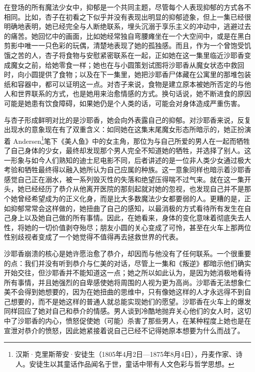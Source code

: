 在登场的所有魔法少女中，抑郁是一个共同主题，尽管每个人表现抑郁的方式各不相同。比如，杏子在初看之下似乎并没有表现出明显的抑郁迹象，但上一集已经很明确地表明，她已经完全与人断绝联系，埋头沉溺于享乐主义的冲动中，逃避过去的痛苦。她回忆中的画面，比如她经常独自弯腰瘫坐在一个大空间中，或是在黑白剪影中唯一一只色彩的玩偶，清楚地表现了她的孤独感。而且，作为一个曾饱受饥饿之苦的人，杏子将食物与安慰紧密联系在一起，正如她在这一集里临近沙耶香变成魔女之前，给她零食一样；她也在与小圆策划试图将沙耶香从魔女状态中救回时，向小圆提供了食物；以及在下一集里，她把沙耶香尸体藏在公寓里的那堆包装纸和容器中，都可以证明这一点。对杏子来说，食物是建立原本被她所否定的与他人和世界联系的方式，也是她用来治愈情感的方式。换句话说，她不断进食的原因可能是她患有饮食障碍，如果她仍是个人类的话，可能会对身体造成严重伤害。

与杏子形成鲜明对比的是沙耶香，她会向外表露自己的抑郁。对沙耶香来说，反复出现水的意象现在有了双重含义：如同她在这集末尾魔女形态所暗示的，她正扮演着 Andersen\footnote{汉斯·克里斯蒂安·安徒生（1805年4月2日—1875年8月4日），丹麦作家、诗人。安徒生以其童话作品闻名于世，童话中带有人文色彩与哲学思想。}笔下《美人鱼》中的女主角，那位为与自己所爱的男人在一起而牺牲了自己身体的少女，最终却发现那个男人完全不知道她的牺牲，并选择了别人\cite{ref45}。这一形象与如今人们熟知的迪士尼电影\cite{ref46}不同，后者讲述的是一位非人类少女通过极大考验和牺牲最终得以融入她所认为自己应属的种族。这一意象同样也暗示着沙耶香感觉自己正在溺水，被一系列毁灭性的失落和绝望压得喘不过气来。就在这一集开头，她已经经历了恭介从他离开医院的那刻起就对她的忽视，也发现自己并不是那个她曾经希望成为的正义化身，而是比大多数魔法少女都要弱的人。更糟的是，正如抑郁常常会这样做的，她扭曲了自己的感知，以最消极的方式看待所有发生在自己身上以及她自己做的所有事情。因此，在她看来，身体的变化意味着彻底失去人性，将她的一切价值剥夺殆尽；朋友小圆的关心变成了可怜，甚至在火车上那两位性别歧视者变成了一个她觉得不值得再去拯救世界的代表。

沙耶香崩溃的核心是她许愿治愈了恭介，却因而与他没有了任何联系。一个很重要的点：我们并没有听到恭介与仁美的对话，尽管上一集和《叛逆》都暗示他们确实开始交往，但沙耶香并不能知道这一点；她之所以如此认为，是因为她消极地看待所有事情，并且她强烈的自卑感使她将周围的人视为更为高尚。沙耶香无法想象仁美不会得到她想要的，因为在她扭曲的思维中，只有像她这样的人才永远得不到自己想要的，而不是她这样的普通人就总能实现她们的愿望。沙耶香在火车上的爆发同样回应了她对自己和恭介的情感。男人谈到冷酷地抛弃关心他们的女人时，这切中了沙耶香的内心，愤怒促使她（可能）杀害了那些男人，在某种程度上她也是在宣泄对恭介的愤怒，因此她紧接着说自己已经不记得她原本想要为什么而战了。

